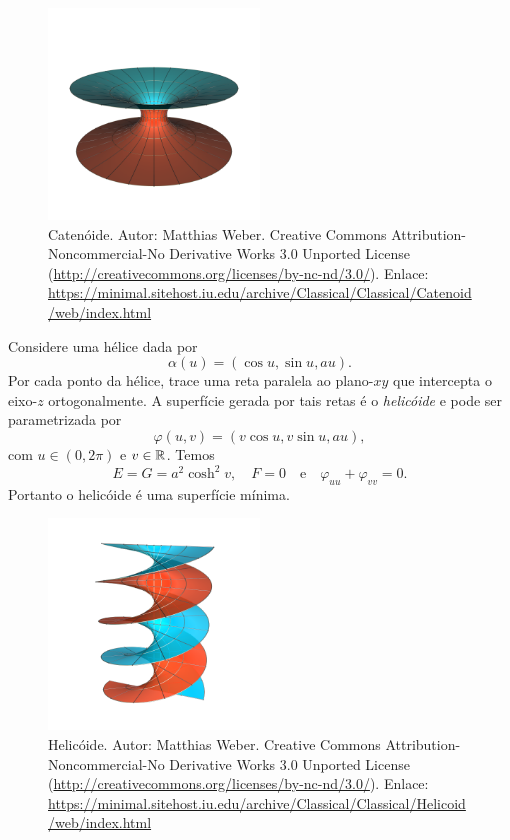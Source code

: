 \begin{figure}
	\centering
	\includegraphics[width=0.5\textwidth]{images/catenoid}
	\caption{Catenóide. Autor: Matthias Weber. Creative Commons Attribution-Noncommercial-No Derivative Works 3.0 Unported License (\url{http://creativecommons.org/licenses/by-nc-nd/3.0/}). Enlace: \url{https://minimal.sitehost.iu.edu/archive/Classical/Classical/Catenoid/web/index.html}}
\end{figure}

\begin{exemplo}
	Considere uma hélice dada por
	\begin{equation*}
	\alpha(u) = \left( \cos u, \sin u, au \right).
	\end{equation*}
	Por cada ponto da hélice, trace uma reta paralela ao plano-$xy$ que intercepta o eixo-$z$ ortogonalmente.
	A superfície gerada por tais retas é o \emph{helicóide} e pode ser parametrizada por
	\begin{equation*}
	\varphi(u,v) = \left( v \cos u, v \sin u, au \right),
	\end{equation*}
	com $u \in (0, 2 \pi)$ e $v \in \mathbb{R}$. Temos
	\begin{equation*}
	E = G = a^2 \cosh^2 v, \quad F = 0 \quad \text{e} \quad \varphi_{uu} + \varphi_{vv} = 0.
	\end{equation*}
	Portanto o helicóide é uma superfície mínima.
\end{exemplo}

\begin{figure}
	\centering
	\includegraphics[width=0.5\textwidth]{images/helicoid}
	\caption{Helicóide. Autor: Matthias Weber. Creative Commons Attribution-Noncommercial-No Derivative Works 3.0 Unported License (\url{http://creativecommons.org/licenses/by-nc-nd/3.0/}). Enlace: \url{https://minimal.sitehost.iu.edu/archive/Classical/Classical/Helicoid/web/index.html}}
\end{figure}

